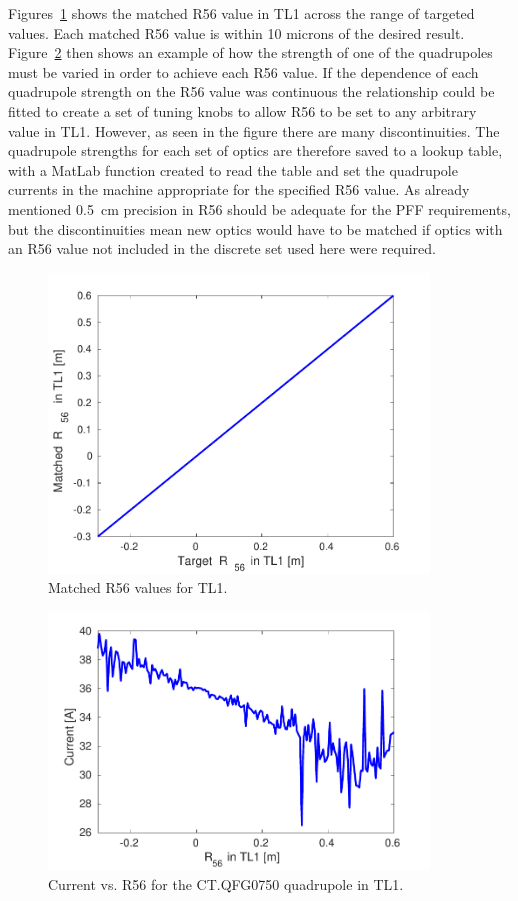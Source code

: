 Figures~\ref{f:r56MatchedVsTarget} shows the matched R56 value in TL1 across the range of targeted values. Each matched R56 value is within 10 microns of the desired result. Figure~\ref{f:CTQFG0750} then shows an example of how the strength of one of the quadrupoles must be varied in order to achieve each R56 value. If the dependence of each quadrupole strength on the R56 value was continuous the relationship could be fitted to create a set of tuning knobs to allow R56 to be set to any arbitrary value in TL1. However, as seen in the figure there are many discontinuities. The quadrupole strengths for each set of optics are therefore saved to a lookup table, with a MatLab function created to read the table and set the quadrupole currents in the machine appropriate for the specified R56 value. As already mentioned 0.5~cm precision in R56 should be adequate for the PFF requirements, but the discontinuities mean new optics would have to be matched if optics with an R56 value not included in the discrete set used here were required.

\begin{figure}
  \centering
  \includegraphics[width=0.9\textwidth]{Figures/propagation/r56MatchedVsTarget}
  \caption{Matched R56 values for TL1.}
  \label{f:r56MatchedVsTarget}
\end{figure}

\begin{figure}
  \centering
  \includegraphics[width=0.9\textwidth]{Figures/propagation/CTQFG0750}
  \caption{Current vs. R56 for the CT.QFG0750 quadrupole in TL1.}
  \label{f:CTQFG0750}
\end{figure}

